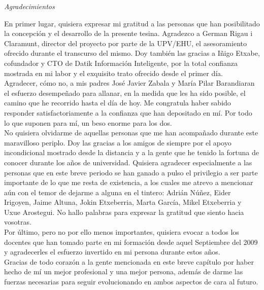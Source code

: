 \begin{flushright}
	\Large\textit{Agradecimientos}
\end{flushright}

En primer lugar, quisiera expresar mi gratitud a las personas que han posibilitado la concepción y el desarrollo de la presente tesina. Agradezco a German Rigau i Claramunt, director del proyecto por parte de la UPV/EHU, el asesoramiento ofrecido durante el transcurso del mismo. Doy también las gracias a Iñigo Etxabe, cofundador y CTO de Datik Información Inteligente, por la total confianza mostrada en mi labor y el exquisito trato ofrecido desde el primer día.\\

Agradecer, cómo no, a mis padres José Javier Zabala y María Pilar Barandiaran el esfuerzo desempeñado para allanar, en la medida que les ha sido posible, el camino que he recorrido hasta el día de hoy. Me congratula haber sabido responder satisfactoriamente a la confianza que han depositado en mí. Por todo lo que suponen para mí, un beso enorme para los dos.\\

No quisiera olvidarme de aquellas personas que me han acompañado durante este maravilloso periplo. Doy las gracias a los amigos de siempre por el apoyo incondicional mostrado desde la distancia y a la gente que he tenido la fortuna de conocer durante los años de universidad. Quisiera agradecer especialmente a las personas que en este breve periodo se han ganado a pulso el privilegio a ser parte importante de lo que me resta de existencia, a los cuales me atrevo a mencionar aún con el temor de dejarme a alguna en el tintero: Adrián Núñez, Eider Irigoyen, Jaime Altuna, Jokin Etxeberria, Marta García, Mikel Etxeberria y Uxue Arostegui. No hallo palabras para expresar la gratitud que siento hacia vosotras.\\

Por último, pero no por ello menos importantes, quisiera evocar a todos los docentes que han tomado parte en mi formación desde aquel Septiembre del 2009 y agradecerles el esfuerzo invertido en mi persona durante estos años.\\

Gracias de todo corazón a la gente mencionada en este breve capítulo por haber hecho de mí un mejor profesional y una mejor persona, además de darme las fuerzas necesarias para seguir evolucionando en ambos aspectos de cara al futuro.

